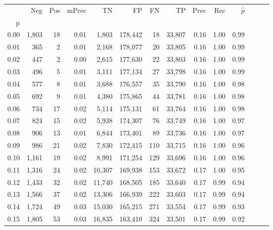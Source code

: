 \begin{tabular}{rrrrrrrrrrrrrr}
\toprule
{} &    Neg &  Pos & mPrec &       TN &       FP &      FN &      TP &  Prec &   Rec & $\hat{p}$ \\
p    &        &      &       &          &          &         &         &       &       &           \\
\midrule
0.00 &  1,803 &   18 &  0.01 &    1,803 &  178,442 &      18 &  33,807 &  0.16 &  1.00 &      0.99 \\
0.01 &    365 &    2 &  0.01 &    2,168 &  178,077 &      20 &  33,805 &  0.16 &  1.00 &      0.99 \\
0.02 &    447 &    2 &  0.00 &    2,615 &  177,630 &      22 &  33,803 &  0.16 &  1.00 &      0.99 \\
0.03 &    496 &    5 &  0.01 &    3,111 &  177,134 &      27 &  33,798 &  0.16 &  1.00 &      0.99 \\
0.04 &    577 &    8 &  0.01 &    3,688 &  176,557 &      35 &  33,790 &  0.16 &  1.00 &      0.98 \\
0.05 &    692 &    9 &  0.01 &    4,380 &  175,865 &      44 &  33,781 &  0.16 &  1.00 &      0.98 \\
0.06 &    734 &   17 &  0.02 &    5,114 &  175,131 &      61 &  33,764 &  0.16 &  1.00 &      0.98 \\
0.07 &    824 &   15 &  0.02 &    5,938 &  174,307 &      76 &  33,749 &  0.16 &  1.00 &      0.97 \\
0.08 &    906 &   13 &  0.01 &    6,844 &  173,401 &      89 &  33,736 &  0.16 &  1.00 &      0.97 \\
0.09 &    986 &   21 &  0.02 &    7,830 &  172,415 &     110 &  33,715 &  0.16 &  1.00 &      0.96 \\
0.10 &  1,161 &   19 &  0.02 &    8,991 &  171,254 &     129 &  33,696 &  0.16 &  1.00 &      0.96 \\
0.11 &  1,316 &   24 &  0.02 &   10,307 &  169,938 &     153 &  33,672 &  0.17 &  1.00 &      0.95 \\
0.12 &  1,433 &   32 &  0.02 &   11,740 &  168,505 &     185 &  33,640 &  0.17 &  0.99 &      0.94 \\
0.13 &  1,566 &   37 &  0.02 &   13,306 &  166,939 &     222 &  33,603 &  0.17 &  0.99 &      0.94 \\
0.14 &  1,724 &   49 &  0.03 &   15,030 &  165,215 &     271 &  33,554 &  0.17 &  0.99 &      0.93 \\
0.15 &  1,805 &   53 &  0.03 &   16,835 &  163,410 &     324 &  33,501 &  0.17 &  0.99 &      0.92 \\

\end{tabular}
